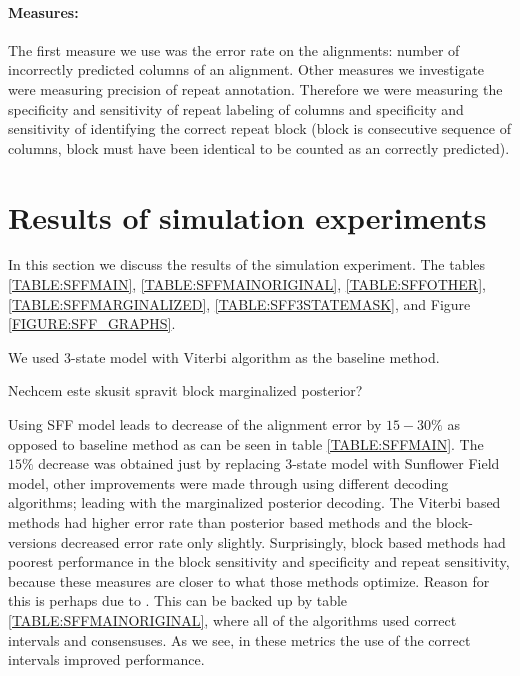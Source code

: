 \paragraph{Measures:} The first measure we use was the error rate on the
alignments: number of incorrectly predicted columns of an alignment. Other
measures we investigate were measuring precision of repeat annotation. Therefore 
we were measuring the specificity and sensitivity of repeat labeling of columns
and specificity and sensitivity of identifying the correct repeat block (block
is consecutive sequence of columns, block must have been identical to be
counted as an correctly predicted).

\section{Results of simulation experiments}

\begin{reformulate*}
In this section we discuss the results of the simulation experiment. The tables
\ref{TABLE:SFFMAIN}, \ref{TABLE:SFFMAINORIGINAL},
\ref{TABLE:SFFOTHER},\ref{TABLE:SFFMARGINALIZED}, \ref{TABLE:SFF3STATEMASK},
and Figure \ref{FIGURE:SFF_GRAPHS}. 

We used 3-state model with Viterbi algorithm as the baseline method.

Nechcem este skusit spravit block marginalized posterior?
\end{reformulate*}



Using SFF model leads to decrease of the alignment error by $15-30\%$ as
opposed to baseline method as can be seen in table \ref{TABLE:SFFMAIN}. The
$15\%$ decrease was obtained just by replacing 3-state model with Sunflower
Field model, other improvements were made through using different decoding
algorithms; leading with the marginalized posterior decoding. The Viterbi based
methods had higher error rate than posterior based methods and the
block-versions decreased error rate only slightly. Surprisingly, block based
methods had poorest performance in the block sensitivity and specificity and
repeat sensitivity, because these measures are closer to what those methods
optimize. Reason for this is perhaps due to . This can be backed up by table \ref{TABLE:SFFMAINORIGINAL}, where
all of the algorithms used correct intervals and consensuses. As we see, in
these metrics the use of the correct intervals improved performance.

